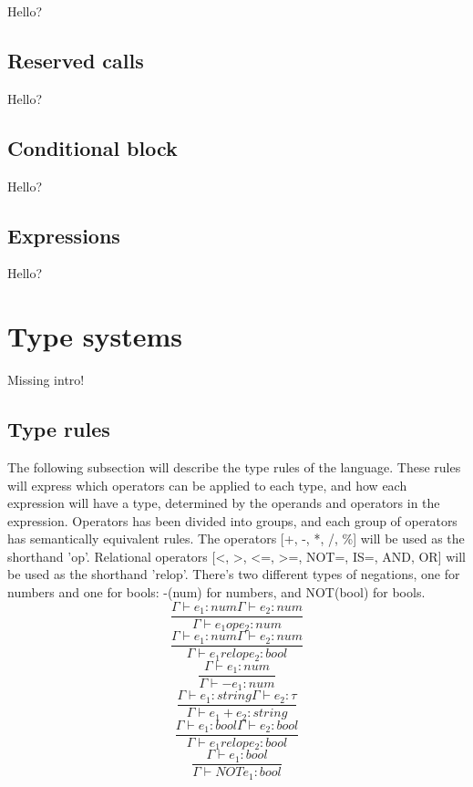 \begin{defi}
Hello?
\end{defi}
\subsection{Reserved calls}


\begin{defi}
Hello?
\end{defi}
\subsection{Conditional block}


\begin{defi}
Hello?
\end{defi}
\subsection{Expressions}


\begin{defi}
Hello?
\end{defi}
\section{Type systems}
Missing intro!

\subsection{Type rules}
The following subsection will describe the type rules of the language. These rules will express which operators can be applied to each type, and how each expression will have a type, determined by the operands and operators in the expression.
Operators has been divided into groups, and each group of operators has semantically equivalent rules.
The operators [+, -, *, /, \%] will be used as the shorthand 'op'. Relational operators [<, >, <=, >=, NOT=, IS=, AND, OR] will be used as the shorthand 'relop'. There's two different types of negations, one for numbers and one for bools: -(num) for numbers, and NOT(bool) for bools.
\[
\dfrac{\Gamma \vdash e_1 : num \Gamma \vdash e_2 : num}{\Gamma \vdash e_1 op e_2 : num}
\]
\[
\dfrac{\Gamma \vdash e_1 : num \Gamma \vdash e_2 : num}{\Gamma \vdash e_1 relop e_2 : bool}
\]
\[
\dfrac{\Gamma \vdash e_1 : num}{\Gamma \vdash -e_1 : num}
\]
\[
\dfrac{\Gamma \vdash e_1 : string \Gamma \vdash e_2 : \tau}{\Gamma \vdash e_1 + e_2 : string}
\]
\[
\dfrac{\Gamma \vdash e_1 : bool \Gamma \vdash e_2 : bool}{\Gamma \vdash e_1 relop e_2 : bool}
\]
\[
\dfrac{\Gamma \vdash e_1 : bool}{\Gamma \vdash NOTe_1 : bool}
\]
